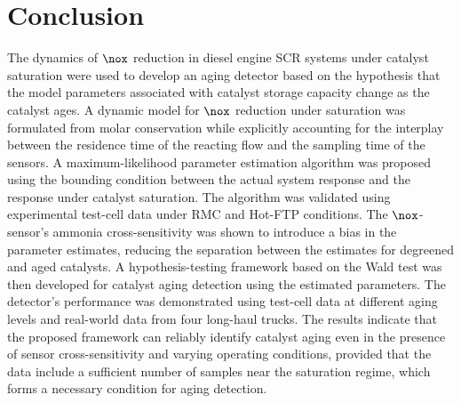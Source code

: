 \section{Conclusion}
The dynamics of $\nox$ reduction in diesel engine SCR systems under catalyst saturation were used to develop an aging
detector based on the hypothesis that the model parameters associated with catalyst storage capacity change as the
catalyst ages. A dynamic model for $\nox$ reduction under saturation was formulated from molar conservation while
explicitly accounting for the interplay between the residence time of the reacting flow and the sampling time of the
sensors. A maximum-likelihood parameter estimation algorithm was proposed using the bounding condition between the
actual system response and the response under catalyst saturation. The algorithm was validated using experimental test-cell
data under RMC and Hot-FTP conditions. The $\nox$-sensor's ammonia cross-sensitivity was shown to introduce a bias
in the parameter estimates, reducing the separation between the estimates for degreened and aged catalysts. A
hypothesis-testing framework based on the Wald test was then developed for catalyst aging detection using the estimated
parameters. The detector's performance was demonstrated using test-cell data at different aging levels and real-world
data from four long-haul trucks. The results indicate that the proposed framework can reliably identify catalyst aging
even in the presence of sensor cross-sensitivity and varying operating conditions, provided that the data include a
sufficient number of samples near the saturation regime, which forms a necessary condition for aging detection.
